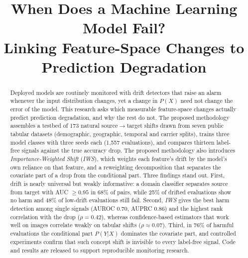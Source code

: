 \documentclass[conference]{IEEEtran}
\theoremstyle{plainhead}
\newcommand{\iws}{\textit{IWS}}
\begin{document}
\title{When Does a Machine Learning Model Fail?\\
Linking Feature-Space Changes to Prediction Degradation}

\author{
\and
{}
}

\maketitle

\begin{abstract}
Deployed models are routinely monitored with drift detectors that raise an alarm whenever the input distribution changes, yet a change in $P(X)$ need not change the error of the model. This research asks which measurable feature-space changes actually predict prediction degradation, and why the rest do not. The proposed methodology assembles a testbed of 173 natural source$\to$target shifts drawn from seven public tabular datasets (demographic, geographic, temporal and carrier splits), trains three model classes with three seeds each (1{,}557 evaluations), and compares thirteen label-free signals against the true accuracy drop. The proposed methodology also introduces \emph{Importance-Weighted Shift} (\iws{}), which weights each feature's drift by the model's own reliance on that feature, and a reweighting decomposition that separates the covariate part of a drop from the conditional part. Three findings stand out. First, drift is nearly universal but weakly informative: a domain classifier separates source from target with AUC $\ge 0.95$ in 68\% of pairs, while 25\% of drifted evaluations show no harm and 48\% of low-drift evaluations still fail. Second, \iws{} gives the best harm detection among single signals (AUROC 0.70, AUPRC 0.86) and the highest rank correlation with the drop ($\rho=0.42$), whereas confidence-based estimators that work well on images correlate weakly on tabular shifts ($\rho \approx 0.07$). Third, in 76\% of harmful evaluations the conditional part $P(Y|X)$ dominates the covariate part, and controlled experiments confirm that such concept shift is invisible to every label-free signal. Code and results are released to support reproducible monitoring research.
\end{abstract}
\end{document}
